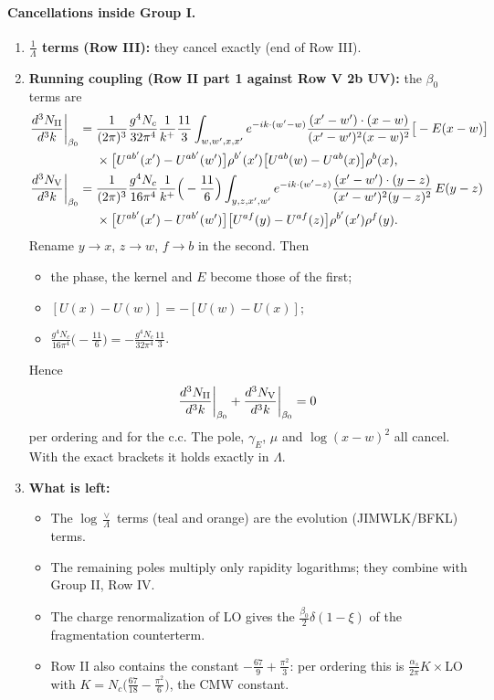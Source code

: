 \documentclass[9pt]{article}
\numberwithin{equation}{section}
\begin{document}
\paragraph{Cancellations inside Group I.}
\begin{enumerate}
\item \textbf{$\frac{1}{\Lambda}$ terms (Row III):} they cancel exactly (end of Row III).
\item \textbf{Running coupling (Row II part 1 against Row V 2b UV):} the $\beta_{0}$ terms are
\begin{align*}
\frac{d^{3}N_{\rm II}}{d^{3}k}\bigg|_{\beta_{0}}={}&\frac{1}{(2\pi)^{3}}\frac{g^{4}N_{c}}{32\pi^{4}}\frac{1}{k^{+}}\frac{11}{3}\int_{w,w',x,x'}e^{-ik\cdot(w'-w)}\frac{(x'-w')\cdot(x-w)}{(x'-w')^{2}(x-w)^{2}}\big[-E(x-w)\big]\\
&\times\big[U^{ab'}(x')-U^{ab'}(w')\big]\rho^{b'}(x')\big[U^{ab}(w)-U^{ab}(x)\big]\rho^{b}(x),\\
\frac{d^{3}N_{\rm V}}{d^{3}k}\bigg|_{\beta_{0}}={}&\frac{1}{(2\pi)^{3}}\frac{g^{4}N_{c}}{16\pi^{4}}\frac{1}{k^{+}}\Big(-\frac{11}{6}\Big)\int_{y,z,x',w'}e^{-ik\cdot(w'-z)}\frac{(x'-w')\cdot(y-z)}{(x'-w')^{2}(y-z)^{2}}\,E(y-z)\\
&\times\big[U^{ab'}(x')-U^{ab'}(w')\big]\big[U^{af}(y)-U^{af}(z)\big]\rho^{b'}(x')\rho^{f}(y).
\end{align*}
Rename $y\to x$, $z\to w$, $f\to b$ in the second. Then
\begin{itemize}
\item the phase, the kernel and $E$ become those of the first;
\item $[U(x)-U(w)]=-[U(w)-U(x)]$;
\item $\frac{g^{4}N_{c}}{16\pi^{4}}\big(-\frac{11}{6}\big)=-\frac{g^{4}N_{c}}{32\pi^{4}}\frac{11}{3}$.
\end{itemize}
Hence
\begin{equation*}
\frac{d^{3}N_{\rm II}}{d^{3}k}\bigg|_{\beta_{0}}+\frac{d^{3}N_{\rm V}}{d^{3}k}\bigg|_{\beta_{0}}=0
\end{equation*}
per ordering and for the c.c. The pole, $\gamma_{E}$, $\mu$ and $\log(x-w)^{2}$ all cancel. With the exact brackets it holds exactly in $\Lambda$.
\item \textbf{What is left:}
\begin{itemize}
\item The $\log\frac{\vee}{\Lambda}$ terms (teal and orange) are the evolution (JIMWLK/BFKL) terms.
\item The remaining poles multiply only rapidity logarithms; they combine with Group II, Row IV.
\item The charge renormalization of LO gives the $\frac{\beta_{0}}{2}\delta(1-\xi)$ of the fragmentation counterterm.
\item Row II also contains the constant $-\frac{67}{9}+\frac{\pi^{2}}{3}$: per ordering this is $\frac{\alpha_{s}}{2\pi}K\times$LO with $K=N_{c}\big(\frac{67}{18}-\frac{\pi^{2}}{6}\big)$, the CMW constant.
\end{itemize}
\end{enumerate}
\endgroup
\end{document}
